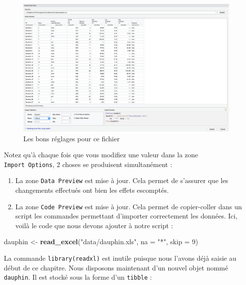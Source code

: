 \documentclass[a4paperpaper,]{article}
\newenvironment{Shaded}{\begin{snugshade}}{\end{snugshade}}
\newcommand{\DataTypeTok}[1]{\textcolor[rgb]{0.00,0.34,0.68}{#1}}
\newcommand{\DecValTok}[1]{\textcolor[rgb]{0.69,0.50,0.00}{#1}}
\newcommand{\KeywordTok}[1]{\textcolor[rgb]{0.12,0.11,0.11}{\textbf{#1}}}
\newcommand{\NormalTok}[1]{\textcolor[rgb]{0.12,0.11,0.11}{#1}}
\newcommand{\StringTok}[1]{\textcolor[rgb]{0.75,0.01,0.01}{#1}}
\providecommand{\tightlist}{%
  \setlength{\itemsep}{0pt}\setlength{\parskip}{0pt}}
\begin{document}
\begin{figure}[htpb]

{\centering \includegraphics[width=1\linewidth]{images/import3} 

}

\caption{Les bons réglages pour ce fichier}\label{fig:import3}
\end{figure}

Notez qu'à chaque fois que vous modifiez une valeur dans la zone \texttt{Import\ Options}, 2 choses se produisent simultanément :

\begin{enumerate}
\def\labelenumi{\arabic{enumi}.}
\tightlist
\item
  La zone \texttt{Data\ Preview} est mise à jour. Cela permet de s'assurer que les changements effectués ont bien les effets escomptés.
\item
  La zone \texttt{Code\ Preview} est mise à jour. Cela permet de copier-coller dans un script les commandes permettant d'importer correctement les données. Ici, voilà le code que nous devons ajouter à notre script :
\end{enumerate}

\begin{Shaded}
\begin{Highlighting}[]
\NormalTok{dauphin <-}\StringTok{ }\KeywordTok{read_excel}\NormalTok{(}\StringTok{"data/dauphin.xls"}\NormalTok{, }\DataTypeTok{na =} \StringTok{"*"}\NormalTok{, }\DataTypeTok{skip =} \DecValTok{9}\NormalTok{)}
\end{Highlighting}
\end{Shaded}

La commande \texttt{library(readxl)} est inutile puisque nous l'avons déjà saisie au début de ce chapitre. Nous disposons maintenant d'un nouvel objet nommé \texttt{dauphin}. Il est stocké sous la forme d'un \texttt{tibble} :
\end{document}
